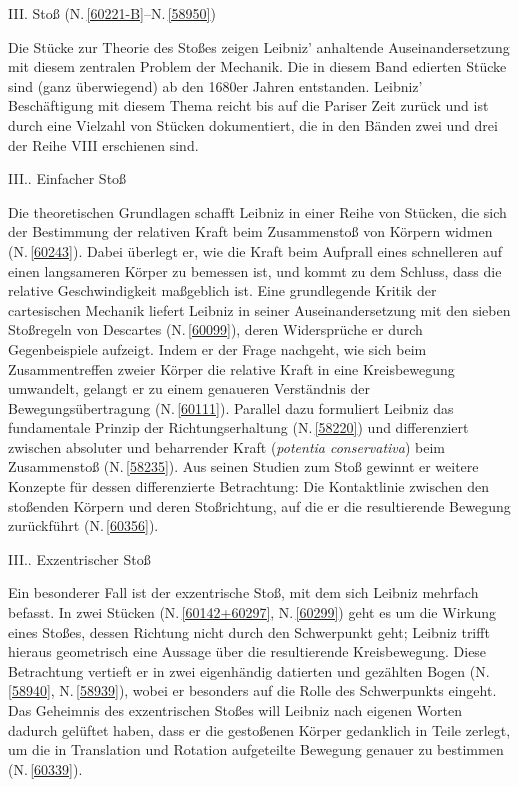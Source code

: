 \par
\vspace{2.0em}
\noindent
III. Stoß (N.\,\ref{60221-B}--N.\,\ref{58950})%
\par
\vspace{0.25em}
\noindent
Die Stücke zur Theorie des Stoßes zeigen Leibniz' anhaltende Auseinandersetzung mit diesem zentralen Problem der Mechanik. Die in diesem Band edierten Stücke sind (ganz überwiegend) ab den 1680er Jahren entstanden. Leibniz' Beschäftigung mit diesem Thema reicht bis auf die Pariser Zeit zurück und ist durch eine Vielzahl von Stücken dokumentiert, die in den Bänden zwei und drei der Reihe VIII erschienen sind.
\par
\vspace{1.0em}
\noindent
III.. Einfacher Stoß%
\par \noindent
Die theoretischen Grundlagen schafft Leibniz in einer Reihe von Stücken, die sich der Bestimmung der relativen Kraft beim Zusammenstoß von Körpern widmen (N.\,\ref{60243}). Dabei überlegt er, wie die Kraft beim Aufprall eines schnelleren auf einen langsameren Körper zu bemessen ist, und kommt zu dem Schluss, dass die relative Geschwindigkeit maßgeblich ist. Eine grundlegende Kritik der cartesischen Mechanik liefert Leibniz in seiner Auseinandersetzung mit den sieben Stoßregeln von Descartes (N.\,\ref{60099}), deren Widersprüche er durch Gegenbeispiele aufzeigt. %
Indem er der Frage nachgeht, wie sich beim Zusammentreffen zweier Körper die relative Kraft in eine Kreisbewegung umwandelt, gelangt er zu einem genaueren Verständnis der Bewegungsübertragung (N.\,\ref{60111}). Parallel dazu formuliert Leibniz das fundamentale Prinzip der Richtungserhaltung (N.\,\ref{58220}) und differenziert zwischen absoluter und beharrender Kraft (\textit{potentia conservativa}) beim Zusammenstoß (N.\,\ref{58235}). %
Aus seinen Studien zum Stoß gewinnt er weitere Konzepte für dessen differenzierte Betrachtung: Die Kontaktlinie zwischen den stoßenden Körpern und deren Stoßrichtung, auf die er die resultierende Bewegung zurückführt (N.\,\ref{60356}).%
\par
\vspace{1.0em}
\noindent
III.. Exzentrischer Stoß%
\par \noindent
Ein besonderer Fall ist der exzentrische Stoß, mit dem sich Leibniz mehrfach befasst. In zwei Stücken (N.\,\ref{60142+60297}, N.\,\ref{60299}) geht es um die Wirkung eines Stoßes, dessen Richtung nicht durch den Schwerpunkt geht; Leibniz trifft hieraus geometrisch eine Aussage über die resultierende Kreisbewegung. Diese Betrachtung vertieft er in zwei eigenhändig datierten und gezählten Bogen (N.\,\ref{58940}, N.\,\ref{58939}), wobei er besonders auf die Rolle des Schwerpunkts eingeht. Das Geheimnis des exzentrischen Stoßes will Leibniz nach eigenen Worten dadurch gelüftet haben, dass er die gestoßenen Körper gedanklich in Teile zerlegt, um die in Translation und Rotation aufgeteilte Bewegung genauer zu bestimmen (N.\,\ref{60339}).
